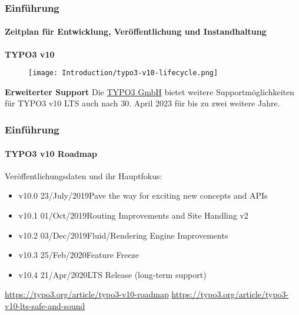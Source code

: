 
\begin{frame}[fragile]
	\frametitle{Einführung}
	\framesubtitle{Zeitplan für Entwicklung, Veröffentlichung und Instandhaltung}

	\textbf{TYPO3 v10}

	\begin{figure}
		\texttt{[image: Introduction/typo3-v10-lifecycle.png]}
	\end{figure}

	\textbf{Erweiterter Support}\newline
	\smaller
		Die \href{https://typo3.com}{TYPO3 GmbH} bietet weitere Supportmöglichkeiten
		für TYPO3 v10 LTS auch nach 30. April 2023 für bis zu zwei weitere Jahre.
	\normalsize

\end{frame}


\begin{frame}[fragile]
	\frametitle{Einführung}
	\framesubtitle{TYPO3 v10 Roadmap}

	Veröffentlichungsdaten und ihr Hauptfokus:

	\begin{itemize}

		\item v10.0 \tabto{1.1cm}23/July/2019\tabto{3.4cm}Pave the way for exciting new concepts and APIs
		\item v10.1 \tabto{1.1cm}01/Oct/2019\tabto{3.4cm}Routing Improvements and Site Handling v2
		\item v10.2 \tabto{1.1cm}03/Dec/2019\tabto{3.4cm}Fluid/Rendering Engine Improvements
		\item v10.3 \tabto{1.1cm}25/Feb/2020\tabto{3.4cm}Feature Freeze
		\item
			\begingroup
				\color{typo3orange}
				v10.4 \tabto{1.1cm}21/Apr/2020\tabto{3.4cm}LTS Release (long-term support)
			\endgroup

	\end{itemize}

	\vspace{0.6cm}
	\smaller
		\url{https://typo3.org/article/typo3-v10-roadmap}\newline
		\url{https://typo3.org/article/typo3-v10-lts-safe-and-sound}
	\normalsize

\end{frame}

